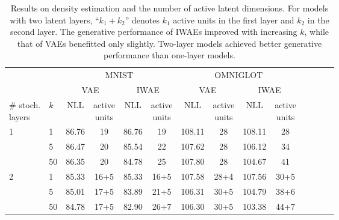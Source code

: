 \documentclass{article} %
\newcommand{\numSamples}{k}
\begin{document}
\begin{table}%
\vspace{-0.3in}
\begin{center}
\begin{tabular}{@{}ll cc cc cc cc cc cc@{}}
              &     & \multicolumn{4}{c}{MNIST} & \multicolumn{4}{c}{OMNIGLOT} \\
\cmidrule(r){3-6} \cmidrule(l){7-10} 
              &     & \multicolumn{2}{c}{VAE} & \multicolumn{2}{c}{IWAE} & \multicolumn{2}{c}{VAE} & \multicolumn{2}{c}{IWAE} \\
\cmidrule(r){3-4} \cmidrule(l){5-6} \cmidrule(lr){7-8} \cmidrule(l){9-10} 
\shortstack{\# stoch. \\ layers} & $\numSamples$ & NLL               & \shortstack{active \\ units}             & NLL               & \shortstack{active \\ units}  & NLL                & \shortstack{active \\ units}   & NLL               & \shortstack{active \\ units}  \\ 
\cmidrule(lr){1-1} \cmidrule(lr){2-2} \cmidrule(lr){3-3}\cmidrule(lr){4-4}\cmidrule(lr){5-5}\cmidrule(lr){6-6} \cmidrule(lr){7-7}\cmidrule(lr){8-8}\cmidrule(lr){9-9}\cmidrule(lr){10-10}\cmidrule(lr){11-11}      \midrule
1             & 1   & 86.76 &  19  & 86.76&  19  & 108.11 & 28 & 108.11 & 28 \\
              & 5   & 86.47 &  20  & 85.54&  22  & 107.62 & 28 & 106.12 & 34 \\
              & 50  & 86.35 &  20  & 84.78&  25  & 107.80 & 28 & 104.67 & 41 \\ \midrule
2             & 1   & 85.33 &  16+5 & 85.33&  16+5& 107.58 &28+4& 107.56 & 30+5 \\
              & 5   & 85.01 &  17+5 & 83.89&  21+5& 106.31 &30+5& 104.79 & 38+6 \\
              & 50  & 84.78 &  17+5 & 82.90&  26+7& 106.30 &30+5& 103.38 & 44+7 \\ \bottomrule
\end{tabular}
\end{center}
\vspace{-0.1in}
\caption{\small Results on density estimation and the number of active latent dimensions. For models with two latent layers, ``$k_1+k_2$'' denotes $k_1$ active units in the first layer and $k_2$ in the second layer. The generative performance of IWAEs improved with increasing $\numSamples$, while that of VAEs benefitted only slightly. Two-layer models achieved better generative performance than one-layer models. }
\label{tbl:results}
\end{table}
\end{document}
